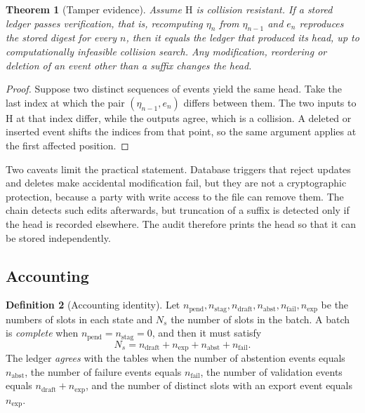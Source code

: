 \documentclass[11pt]{article}
\newtheorem{theorem}{Theorem}[section]
\theoremstyle{definition}
\newtheorem{definition}[theorem]{Definition}
\theoremstyle{remark}
\newcommand{\Hash}{\mathrm{H}}
\begin{document}
\begin{theorem}[Tamper evidence]\label{thm:chain}
Assume $\Hash$ is collision resistant. If a stored ledger passes verification, that is, recomputing $\eta_n$ from $\eta_{n-1}$ and $e_n$ reproduces the stored digest for every $n$, then it equals the ledger that produced its head, up to computationally infeasible collision search. Any modification, reordering or deletion of an event other than a suffix changes the head.
\end{theorem}
\begin{proof}
Suppose two distinct sequences of events yield the same head. Take the last index at which the pair $(\eta_{n-1},e_n)$ differs between them. The two inputs to $\Hash$ at that index differ, while the outputs agree, which is a collision. A deleted or inserted event shifts the indices from that point, so the same argument applies at the first affected position.
\end{proof}

Two caveats limit the practical statement. Database triggers that reject updates and deletes make accidental modification fail, but they are not a cryptographic protection, because a party with write access to the file can remove them. The chain detects such edits afterwards, but truncation of a suffix is detected only if the head is recorded elsewhere. The audit therefore prints the head so that it can be stored independently.

\subsection{Accounting}

\begin{definition}[Accounting identity]\label{def:account}
Let $n_{\mathrm{pend}},n_{\mathrm{stag}},n_{\mathrm{draft}},n_{\mathrm{abst}},n_{\mathrm{fail}},n_{\mathrm{exp}}$ be the numbers of slots in each state and $N_s$ the number of slots in the batch. A batch is \emph{complete} when $n_{\mathrm{pend}}=n_{\mathrm{stag}}=0$, and then it must satisfy
\[
N_s=n_{\mathrm{draft}}+n_{\mathrm{exp}}+n_{\mathrm{abst}}+n_{\mathrm{fail}}.
\]
The ledger \emph{agrees} with the tables when the number of abstention events equals $n_{\mathrm{abst}}$, the number of failure events equals $n_{\mathrm{fail}}$, the number of validation events equals $n_{\mathrm{draft}}+n_{\mathrm{exp}}$, and the number of distinct slots with an export event equals $n_{\mathrm{exp}}$.
\end{definition}
\end{document}
